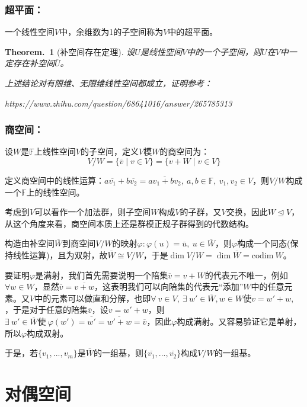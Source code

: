 \documentclass[zihao=-4,UTF8]{report}
\theoremstyle{mystyle} %
\newtheorem{theorem}{Theorem.\,}
\begin{document}
\subsubsection{超平面：}一个线性空间$V$中，余维数为1的子空间称为$V$中的超平面。
\begin{theorem}[补空间存在定理]
    设$U$是线性空间$V$中的一个子空间，则$U$在$V$中一定存在补空间$\overline{U}$。
    {\color{ gray} 上述结论对有限维、无限维线性空间都成立，证明参考：\par https://www.zhihu.com/question/68641016/answer/265785313}
\end{theorem}

\subsubsection{商空间：}   
设$W$是$\mathbb{F}$上线性空间$V$的子空间，定义$V$模$W$的商空间为：
\begin{equation*}
    V/W = \{\overline{v}\mid v \in V\}= \{v + W\mid v\in V\}
\end{equation*}\par
定义商空间中的线性运算：$a\overline{v_1} + b\overline{v_2} = \overline{av_1+bv_2},\ a,b \in \mathbb{F},\ v_1,v_2 \in V $，则$V/W$构成一个$\mathbb{F}$上的线性空间。\par
{\color{gray}\small 考虑到$V$可以看作一个加法群，则子空间$W$构成$V$的子群，又$V$交换，因此$W \unlhd V$，从这个角度来看，商空间本质上还是群模正规子群得到的代数结构。}\par
构造由补空间$\overline{W}$到商空间$V/W$的映射$\varphi:\varphi(u) = \overline{u},\ u \in \overline{W}  $，则$\varphi $构成一个同态(保持线性运算)，且为双射，故$\overline{W} \cong  V/W$，于是$\dim V/W = \dim \overline{W} = \text{codim}\ W$。\par
{\color{gray}\small 要证明$\varphi $是满射，我们首先需要说明一个陪集$\overline{v} = v +W$的代表元不唯一，例如$\forall w \in W$，显然$\overline{v} = \overline{v + w}$，这表明我们可以向陪集的代表元“添加”$W$中的任意元素。又$V$中的元素可以做直和分解，也即$\forall\  v \in V,\ \exists\  w' \in \overline{W},w \in W \text{使}v = w' + w,\ $，于是对于任意的陪集$\overline{v}$，设$v = w' + w$，则$\exists\ w' \in \overline{W}\text{使}\  \varphi(w') = \overline{w'} = \overline{w' +w} = \overline{v}$，因此$\varphi$构成满射。又容易验证它是单射，所以$\varphi$构成双射。}\par
于是，若$\{v_1,...,v_m\}$是$\overline{W}$的一组基，则$\{\overline{v_1},...,\overline{v_2}\}$构成$V/W$的一组基。

\section{对偶空间} 
\end{document}
